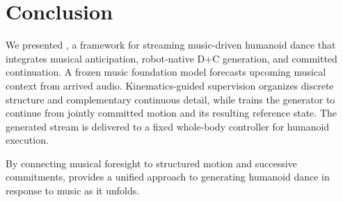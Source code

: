 \section{Conclusion}

We presented \method{}, a framework for streaming
music-driven humanoid dance that integrates musical
anticipation, robot-native D+C generation, and
committed continuation.
A frozen music foundation model forecasts upcoming
musical context from arrived audio.
Kinematics-guided supervision organizes discrete
structure and complementary continuous detail,
while \cof{} trains the generator to continue from
jointly committed motion and its resulting reference
state.
The generated stream is delivered to a fixed
whole-body controller for humanoid execution.


By connecting musical foresight to structured motion
and successive commitments, \method{} provides
a unified approach to generating humanoid dance
in response to music as it unfolds.